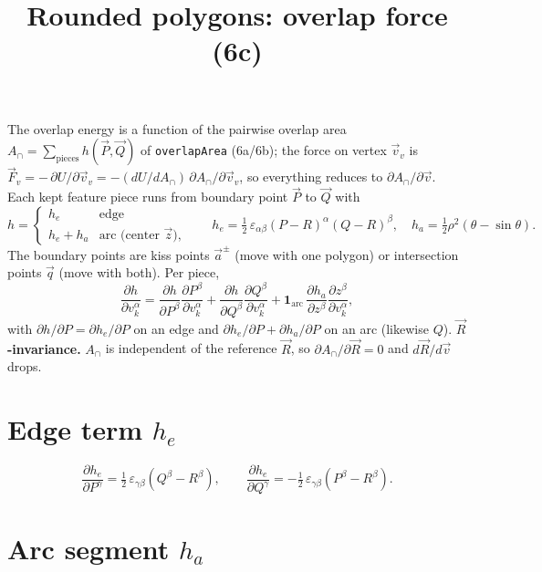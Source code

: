 \documentclass[11pt]{article}
\title{Rounded polygons: overlap force (6c)}
\date{}
\author{}
\newcommand{\vv}[1]{\vec{#1}}
\newcommand{\half}{\tfrac{1}{2}}
\newcommand{\R}{\vv R}
\begin{document}
\maketitle

The overlap energy is a function of the pairwise overlap area $A_{\cap}=\sum_{\text{pieces}}
h(\vv P,\vv Q)$ of \texttt{overlapArea} (6a/6b); the force on vertex $\vv v_v$ is $\vv
F_v=-\,\partial U/\partial\vv v_v=-(dU/dA_{\cap})\,\partial A_{\cap}/\partial\vv v_v$, so everything
reduces to $\partial A_{\cap}/\partial\vv v$. Each kept feature piece runs from boundary point $\vv
P$ to $\vv Q$ with
\[
  h=\begin{cases} h_e & \text{edge}\\ h_e+h_a & \text{arc (center $\vv z$),}\end{cases}\qquad
  h_e=\half\,\varepsilon_{\alpha\beta}(P-R)^{\alpha}(Q-R)^{\beta},\quad
  h_a=\half\rho^2(\theta-\sin\theta).
\]
The boundary points are kiss points $\vv a^{\pm}$ (move with one polygon) or intersection points
$\vv q$ (move with both). Per piece,
\[
  \frac{\partial h}{\partial v_k^{\alpha}}
  =\frac{\partial h}{\partial P^{\beta}}\frac{\partial P^{\beta}}{\partial v_k^{\alpha}}
  +\frac{\partial h}{\partial Q^{\beta}}\frac{\partial Q^{\beta}}{\partial v_k^{\alpha}}
  +\mathbf 1_{\text{arc}}\,\frac{\partial h_a}{\partial z^{\beta}}\frac{\partial z^{\beta}}{\partial v_k^{\alpha}},
\]
with $\partial h/\partial P=\partial h_e/\partial P$ on an edge and $\partial h_e/\partial
P+\partial h_a/\partial P$ on an arc (likewise $Q$). \textbf{$\R$-invariance.} $A_{\cap}$ is
independent of the reference $\R$, so $\partial A_{\cap}/\partial\R=0$ and $d\R/d\vv v$ drops.

\section{Edge term $h_e$}
\[
  \frac{\partial h_e}{\partial P^{\gamma}}=\half\,\varepsilon_{\gamma\beta}(Q^{\beta}-R^{\beta}),
  \qquad
  \frac{\partial h_e}{\partial Q^{\gamma}}=-\half\,\varepsilon_{\gamma\beta}(P^{\beta}-R^{\beta}).
\]

\section{Arc segment $h_a$}
\end{document}
